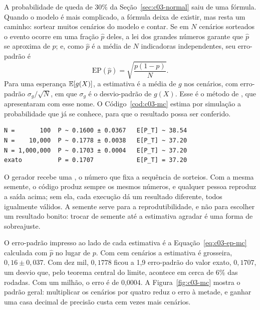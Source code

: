 A probabilidade de queda de 30\% da Seção~\ref{sec:c03-normal} saiu de uma fórmula. Quando o modelo é mais complicado, a fórmula deixa de existir, mas resta um caminho: sortear muitos cenários do modelo e contar. Se em $N$ cenários sorteados o evento ocorre em uma fração $\hat p$ deles, a lei dos grandes números garante que $\hat p$ se aproxima de $p$; e, como $\hat p$ é a média de $N$ indicadoras independentes, seu erro-padrão é
\begin{equation}
  \mathrm{EP}(\hat p) = \sqrt{\frac{p(1-p)}{N}} .
  \label{eq:c03-ep-mc}
\end{equation}
Para uma esperança $\operatorname{\mathbb{E}}[g(X)]$, a estimativa é a média de $g$ nos cenários, com erro-padrão $\sigma_g/\sqrt{N}$, em que $\sigma_g$ é o desvio-padrão de $g(X)$. Esse é o método de , que \citet{metropolis1949} apresentaram com esse nome. O Código~\ref{cod:c03-mc} estima por simulação a probabilidade que já se conhece, para que o resultado possa ser conferido.



\begin{lstlisting}[style=saida]
N =       100  P ~ 0.1600 ± 0.0367   E[P_T] ~ 38.54
N =    10,000  P ~ 0.1778 ± 0.0038   E[P_T] ~ 37.20
N = 1,000,000  P ~ 0.1703 ± 0.0004   E[P_T] ~ 37.20
exato          P = 0.1707            E[P_T] = 37.20
\end{lstlisting}

O gerador  recebe uma , o número que fixa a sequência de sorteios. Com a mesma semente, o código produz sempre os mesmos números, e qualquer pessoa reproduz a saída acima; sem ela, cada execução dá um resultado diferente, todos igualmente válidos. A semente serve para a reprodutibilidade, e não para escolher um resultado bonito: trocar de semente até a estimativa agradar é uma forma de sobreajuste.

O erro-padrão impresso ao lado de cada estimativa é a Equação~\eqref{eq:c03-ep-mc} calculada com $\hat p$ no lugar de $p$. Com cem cenários a estimativa é grosseira, $0,16 \pm 0,037$. Com dez mil, $0,1778$ ficou a 1,9 erro-padrão do valor exato, $0,1707$, um desvio que, pelo teorema central do limite, acontece em cerca de 6\% das rodadas. Com um milhão, o erro é de 0,0004. A Figura~\ref{fig:c03-mc} mostra o padrão geral: multiplicar os cenários por quatro reduz o erro à metade, e ganhar uma casa decimal de precisão custa cem vezes mais cenários.

